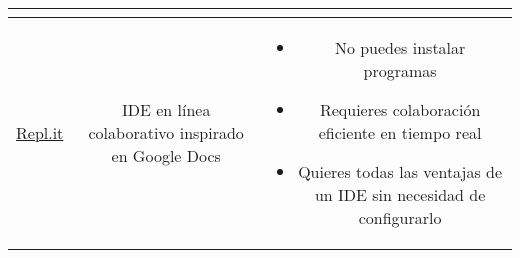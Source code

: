 \documentclass[12pt]{report}
\begin{document}
\begin{table}[!hbt]
\begin{center}
\begin{tabular}{c c c}
{\begin{itemize}
									\end{itemize}
								}
								\\\hline
								\href{https://replit.com}{Repl.it}	
								&
								\parbox[c]{3cm}{
									IDE en línea colaborativo inspirado en Google Docs
								}
								&
								\parbox[c]{8cm}{
									\begin{itemize}
										\item No puedes instalar programas
										\item Requieres colaboración eficiente en tiempo real
										\item Quieres todas las ventajas de un IDE sin necesidad de configurarlo
									\end{itemize}
								}
								\\\hline
						\end{tabular}
					\end{center}
				\end{table}
\end{document}
